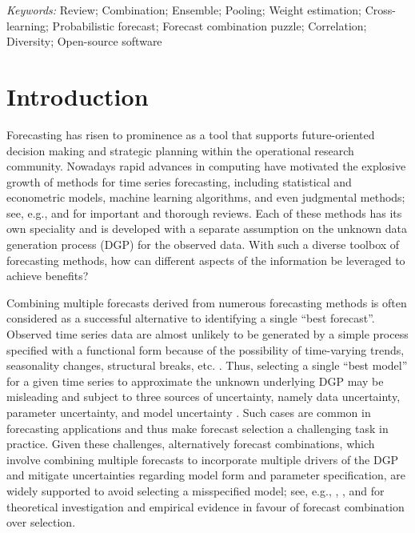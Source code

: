 \documentclass[11pt]{article}
\begin{document}
\noindent%
{\it Keywords:} Review; Combination; Ensemble; Pooling; Weight estimation; Cross-learning; Probabilistic forecast; Forecast combination puzzle; Correlation; Diversity; Open-source software
\vfill

\bigskip

{}


\section{Introduction}
\label{sec:introduction}

Forecasting has risen to prominence as a tool that supports future-oriented decision making and strategic planning within the operational research community. Nowadays rapid advances in computing have motivated the explosive growth of methods for time series forecasting, including statistical and econometric models, machine learning algorithms, and even judgmental methods; see, e.g., \citet{De_Gooijer2006-eg} and \citet{Petropoulos2021-ft} for important and thorough reviews. Each of these methods has its own speciality and is developed with a separate assumption on the unknown data generation process (DGP) for the observed data. With such a diverse toolbox of forecasting methods, how can different aspects of the information be leveraged to achieve benefits?

Combining multiple forecasts derived from numerous forecasting methods is often considered as a successful alternative to identifying a single ``best forecast''. Observed time series data are almost unlikely to be generated by a simple process specified with a functional form because of the possibility of time-varying trends, seasonality changes, structural breaks, etc. \citep{Clements1998-bu}. Thus, selecting a single ``best model'' for a given time series to approximate the unknown underlying DGP may be misleading and subject to three sources of uncertainty, namely data uncertainty, parameter uncertainty, and model uncertainty \citep{Petropoulos2018-fw,Kourentzes2019-na}. Such cases are common in forecasting applications and thus make forecast selection a challenging task in practice. Given these challenges, alternatively forecast combinations, which involve combining multiple forecasts to incorporate multiple drivers of the DGP and mitigate uncertainties regarding model form and parameter specification, are widely supported to avoid selecting a misspecified model; see, e.g., \citet{Kolassa2011-ai}, \citet{Chan2018-jl}, and \citet{Makridakis2020-hu} for theoretical investigation and empirical evidence in favour of forecast combination over selection.
\end{document}
